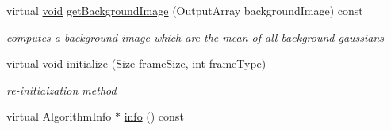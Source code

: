 \begin{DoxyCompactItemize}
virtual \hyperlink{legacy_8hpp_a8bb47f092d473522721002c86c13b94e}{void} \hyperlink{classcv_1_1BackgroundSubtractorMOG2_a0106eb2e0a1c7e3b409bb73ec2958438}{get\-Background\-Image} (Output\-Array background\-Image) const 
\begin{DoxyCompactList}\small\item\em computes a background image which are the mean of all background gaussians \end{DoxyCompactList}\item 
virtual \hyperlink{legacy_8hpp_a8bb47f092d473522721002c86c13b94e}{void} \hyperlink{classcv_1_1BackgroundSubtractorMOG2_a175d48e63228d1b9f1f13ea317783f38}{initialize} (Size \hyperlink{classcv_1_1BackgroundSubtractorMOG2_a83315ebddce879ed98e82b498cd3fe39}{frame\-Size}, int \hyperlink{classcv_1_1BackgroundSubtractorMOG2_a4b7d5f7c5f83596b04e91ff491130fcc}{frame\-Type})
\begin{DoxyCompactList}\small\item\em re-\/initiaization method \end{DoxyCompactList}\item 
virtual Algorithm\-Info $\ast$ \hyperlink{classcv_1_1BackgroundSubtractorMOG2_aac9633c107a0a1e23411c9f86ab53d0d}{info} () const 
\end{DoxyCompactItemize}
